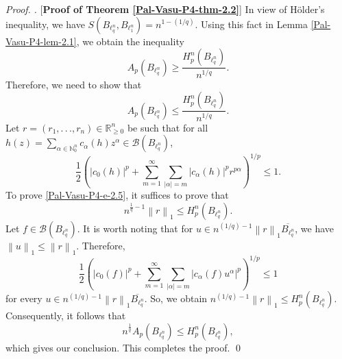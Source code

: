 \documentclass[a4paper,12pt]{amsart}
\theoremstyle{definition}
\newenvironment{pf}[1][]{%
 \vskip 3mm
 \noindent
 \ifthenelse{\equal{#1}{}}%
  {{\slshape Proof. }}%
  {{\slshape #1.} }%
 }%
{\qed\bigskip}
\newcommand{\norm}[1]{\left\lVert#1\right\rVert}
\begin{document}
\begin{pf} [{\bf Proof of Theorem \ref{Pal-Vasu-P4-thm-2.2}}]
In view of H\"{o}lder's inequality, we have	$S(B_{\ell^n_q}, B_{\ell^n_1})=n^{1-(1/q)}$. Using this fact in Lemma \ref{Pal-Vasu-P4-lem-2.1}, we obtain the inequality
	\begin{equation*}
		A_p(B_{\ell^n_q}) \geq  \frac{H^n_p(B_{\ell^n_q})}{n^{1/q}}.
	\end{equation*}
	Therefore, we need to show that
	\begin{equation}\label{Pal-Vasu-P4-e-2.5}
		A_p(B_{\ell^n_q}) \leq  \frac{H^n_p(B_{\ell^n_q})}{n^{1/q}}.
	\end{equation}
	Let $r=(r_1,.\,.\,., r_n)\in \mathbb{R}^n_{\geq 0}$ be such that for all $h(z)=\sum_{\alpha\in \mathbb{N}^n_{0}}c_{\alpha
	}(h)z^{\alpha}\in\mathcal{B}(B_{\ell^n_q})$, 
	\begin{equation*}
		\frac{1}{2}\left(|c_0(h)|^p + \sum_{m=1}^{\infty}\sum_{|\alpha|=m}|c_{\alpha}(h)|^pr^{p\alpha}\right)^{1/p}\leq 1.
	\end{equation*}
	To prove \eqref{Pal-Vasu-P4-e-2.5}, it suffices to prove that
	\begin{equation*}
		n^{\frac{1}{q}-1}\norm{r}_{1}\leq H^n_p(B_{\ell^n_q}).
	\end{equation*}
	Let $f\in \mathcal{B}(B_{\ell^n_q})$. It is worth noting that for $u\in n^{(1/q)-1}\norm{r}_1\overline{B_{\ell^n_q}}$, we have $\norm{u}_1\leq \norm{r}_1$.
	Therefore,
	\begin{equation*}
		\frac{1}{2}\left(|c_0(f)|^p + \sum_{m=1}^{\infty}\sum_{|\alpha|=m}|c_{\alpha}(f)u^{\alpha}|^p\right)^{1/p}\leq 1
	\end{equation*}
	for every $u \in n^{(1/q)-1}\norm{r}_1\overline{B_{\ell^n_q}}.$ So, we obtain $n^{(1/q)-1}\norm{r}_{1}\leq H^n_{p}(B_{\ell^n_{q}})$. Consequently, it follows that
	\begin{equation*}
		n^{\frac{1}{q}}A_p(B_{\ell^n_q})\leq H^n_p(B_{\ell^n_q}),
	\end{equation*}
	which gives our conclusion. This completes the proof.
\end{pf}
\end{document}
